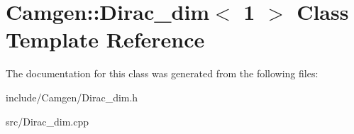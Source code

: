 \hypertarget{a00133}{\section{Camgen\-:\-:Dirac\-\_\-dim$<$ 1 $>$ Class Template Reference}
\label{a00133}
}


The documentation for this class was generated from the following files\-:\begin{DoxyCompactItemize}
\item 
include/\-Camgen/Dirac\-\_\-dim.\-h\item 
src/Dirac\-\_\-dim.\-cpp\end{DoxyCompactItemize}
